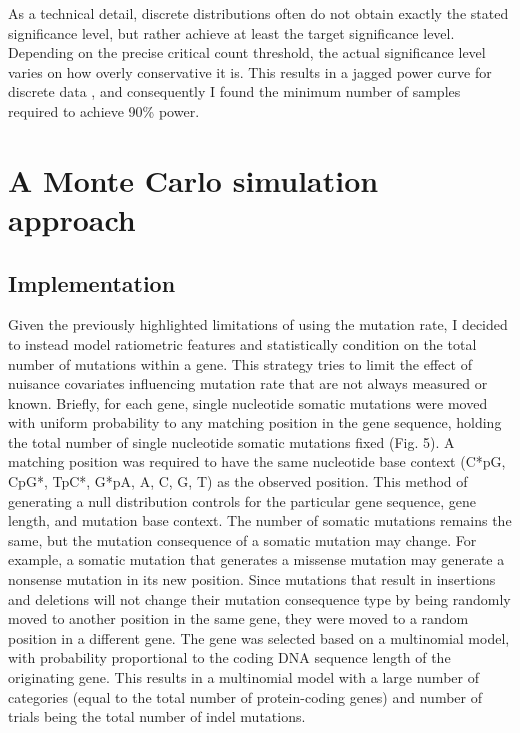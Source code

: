 As a technical detail, discrete distributions often do not obtain exactly the stated significance level, but rather achieve at least the target significance level. Depending on the precise critical count threshold, the actual significance level varies on how overly conservative it is. This results in a jagged power curve for discrete data \cite{RN75}, and consequently I found the minimum number of samples required to achieve 90\% power.

\section{A Monte Carlo simulation approach}
\label{sec:monte_carlo}

\subsection{Implementation}

Given the previously highlighted limitations of using the mutation rate, I decided to instead model ratiometric features and statistically condition on the total number of mutations within a gene. This strategy tries to limit the effect of nuisance covariates influencing mutation rate that are not always measured or known. Briefly, for each gene, single nucleotide somatic mutations were moved with uniform probability to any matching position in the gene sequence, holding the total number of single nucleotide somatic mutations fixed (Fig. 5). A matching position was required to have the same nucleotide base context (C*pG, CpG*, TpC*, G*pA, A, C, G, T) as the observed position. This method of generating a null distribution controls for the particular gene sequence, gene length, and mutation base context. The number of somatic mutations remains the same, but the mutation consequence of a somatic mutation may change. For example, a somatic mutation that generates a missense mutation may generate a nonsense mutation in its new position. Since mutations that result in insertions and deletions will not change their mutation consequence type by being randomly moved to another position in the same gene, they were moved to a random position in a different gene. The gene was selected based on a multinomial model, with probability proportional to the coding DNA sequence length of the originating gene. This results in a multinomial model with a large number of categories (equal to the total number of protein-coding genes) and number of trials being the total number of indel mutations.

